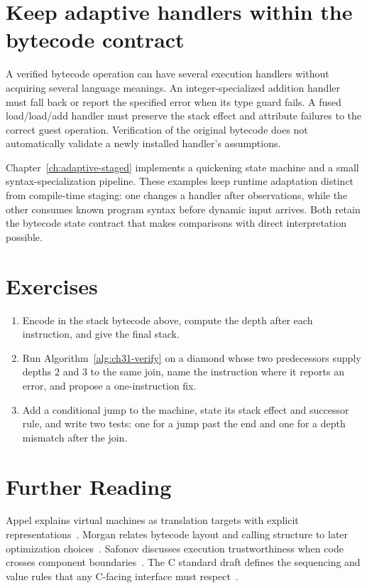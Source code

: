 \section{Keep adaptive handlers within the bytecode contract}
\label{sec:ch31-adaptive-link}

A verified bytecode operation can have several execution handlers without acquiring several language meanings.
An integer-specialized addition handler must fall back or report the specified error when its type guard fails.
A fused load/load/add handler must preserve the stack effect and attribute failures to the correct guest operation.
Verification of the original bytecode does not automatically validate a newly installed handler's assumptions.

Chapter~\ref{ch:adaptive-staged} implements a quickening state machine and a small syntax-specialization pipeline.
These examples keep runtime adaptation distinct from compile-time staging: one changes a handler after observations, while the other consumes known program syntax before dynamic input arrives.
Both retain the bytecode state contract that makes comparisons with direct interpretation possible.

\section{Exercises}\label{sec:ch31-exercises}

\begin{enumerate}
\item Encode  in the stack bytecode above, compute the depth after each instruction, and give the final stack.\label{ex:ch31-encode-trace}
\item Run Algorithm~\ref{alg:ch31-verify} on a diamond whose two predecessors supply depths $2$ and $3$ to the same join, name the instruction where it reports an error, and propose a one-instruction fix.\label{ex:ch31-depth-join}
\item Add a conditional jump to the machine, state its stack effect and successor rule, and write two tests: one for a jump past the end and one for a depth mismatch after the join.\label{ex:ch31-branch-op}
\end{enumerate}

\section{Further Reading}\label{sec:ch31-reading}

Appel explains virtual machines as translation targets with explicit representations~\cite{appel-1998-modern}.
Morgan relates bytecode layout and calling structure to later optimization choices~\cite{morgan-1998-optimizing}.
Safonov discusses execution trustworthiness when code crosses component boundaries~\cite{safonov-2010-trustworthy}.
The C standard draft defines the sequencing and value rules that any C-facing interface must respect~\cite{wg14-2011-c11}.
